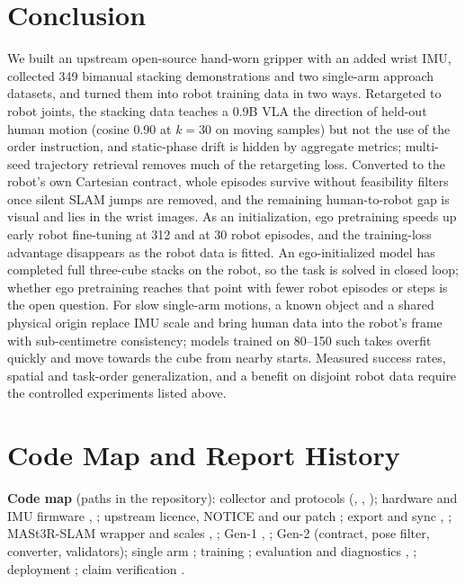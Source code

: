 \documentclass[conference,10pt]{IEEEtran}
\begin{document}
\section{Conclusion}
We built an upstream open-source hand-worn gripper with an added wrist IMU, collected 349 bimanual stacking demonstrations and two
single-arm approach datasets, and turned them into robot training data in two ways. Retargeted to robot joints, the stacking data
teaches a 0.9B VLA the direction of held-out human motion (cosine 0.90 at $k{=}30$ on moving samples) but not the use of the order
instruction, and static-phase drift is hidden by aggregate metrics; multi-seed trajectory retrieval removes much of the retargeting
loss. Converted to the robot's own Cartesian contract, whole episodes survive without feasibility filters once silent SLAM jumps are
removed, and the remaining human-to-robot gap is visual and lies in the wrist images. As an initialization, ego pretraining speeds up
early robot fine-tuning at 312 and at 30 robot episodes, and the training-loss advantage disappears as the robot data is fitted. An
ego-initialized model has completed full three-cube stacks on the robot, so the task is solved in closed loop; whether ego pretraining
reaches that point with fewer robot episodes or steps is the open question. For slow single-arm motions, a known object and a shared
physical origin replace IMU scale and bring human data into the robot's frame with sub-centimetre consistency; models trained on
80--150 such takes overfit quickly and move towards the cube from nearby starts. Measured success rates, spatial and task-order
generalization, and a benefit on disjoint robot data require the controlled experiments listed above.

\appendices
\section{Code Map and Report History}\label{app:code}
\textbf{Code map} (paths in the repository): collector and protocols  (, ,
); hardware and IMU firmware , ; upstream licence, NOTICE and our patch
; export and sync , ; MASt3R-SLAM wrapper and scales
, ; Gen-1 , ;
Gen-2  (contract, pose filter, converter, validators); single arm ; training ; evaluation and
diagnostics , ; deployment ; claim verification .
\end{document}
